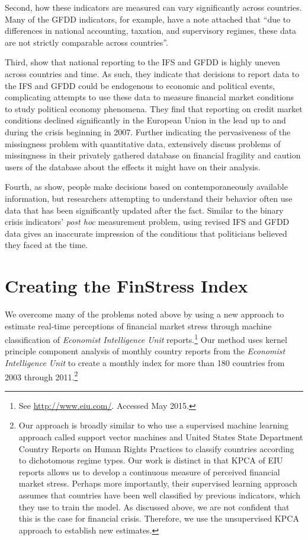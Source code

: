 \documentclass[]{article}
\begin{document}
Second, how these indicators are measured can vary significantly across countries. Many of the GFDD indicators, for example, have a note attached that ``due to differences in national accounting, taxation, and supervisory regimes, these data are not strictly comparable across countries''.

Third, \cite{cghBruegel2015} show that national reporting to the IFS and GFDD is highly uneven across countries and time. As such, they indicate that decisions to report data to the IFS and GFDD could be endogenous to economic and political events, complicating attempts to use these data to measure financial market conditions to study political economy phenomena. They find that reporting on credit market conditions declined significantly in the European Union in the lead up to and during the crisis beginning in 2007. Further indicating the pervasiveness of the missingness problem with quantitative data, \cite{Andrianova2015} extensively discuss problems of missingness in their privately gathered database on financial fragility and caution users of the database about the effects it might have on their analysis.

Fourth, as \cite{KayserLeininger2015} show, people make decisions based on contemporaneously available information, but researchers attempting to understand their behavior often use data that has been significantly updated after the fact. Similar to the binary crisis indicators' \textit{post hoc} measurement problem, using revised IFS and GFDD data gives an inaccurate impression of the conditions that politicians believed they faced at the time.

\section{Creating the FinStress Index}

We overcome many of the problems noted above by using a new approach to estimate real-time perceptions of financial market stress through machine classification of \emph{Economist Intelligence Unit} reports.\footnote{See \url{http://www.eiu.com/}. Accessed May 2015.} Our method uses kernel principle component analysis \citep{Scholkopf1998,lodhi2002,Spirling2012} of monthly country reports from the \emph{Economist Intelligence Unit} to create a monthly index for more than 180 countries from 2003 through 2011.\footnote{Our approach is broadly similar to \cite{Minhas2015} who use a supervised machine learning approach called support vector machines and United States State Department Country Reports on Human Rights Practices to classify countries according to dichotomous regime types. Our work is distinct in that KPCA of EIU reports allows us to develop a continuous measure of perceived financial market stress. Perhaps more importantly, their supervised learning approach assumes that countries have been well classified by previous indicators, which they use to train the model. As discussed above, we are not confident that this is the case for financial crisis. Therefore, we use the unsupervised KPCA approach to establish new estimates.}
\end{document}

